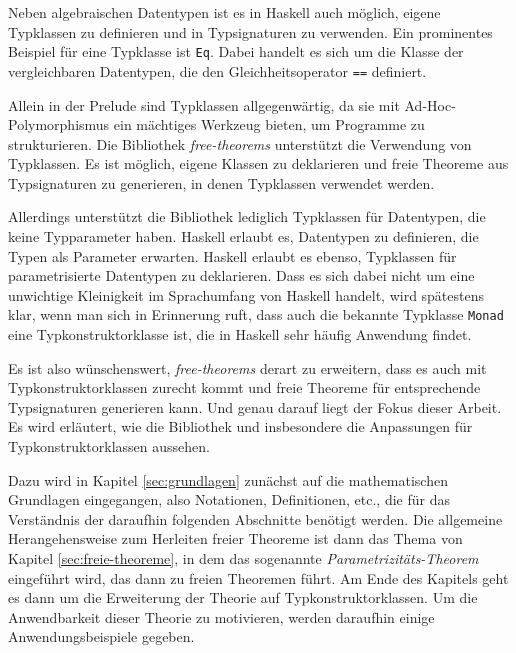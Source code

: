 Neben algebraischen Datentypen ist es in Haskell auch möglich, eigene Typklassen zu definieren und in
Typsignaturen zu verwenden. Ein prominentes Beispiel für eine Typklasse ist \texttt{Eq}. Dabei handelt es sich um
die Klasse der vergleichbaren Datentypen, die den Gleichheitsoperator \texttt{==} definiert.

Allein in der Prelude sind Typklassen allgegenwärtig, da sie mit Ad-Hoc-Poly\-mor\-phis\-mus ein mächtiges Werkzeug bieten,
um Programme zu strukturieren. Die Bibliothek \textit{free-theorems} unterstützt die Verwendung von Typklassen. Es ist möglich, eigene
Klassen zu deklarieren und freie Theoreme aus Typsignaturen zu generieren, in denen Typklassen verwendet werden.

Allerdings unterstützt die Bibliothek lediglich Typklassen für Datentypen, die keine Typparameter haben. Haskell erlaubt es,
Datentypen zu definieren, die Typen als Parameter erwarten. Haskell erlaubt es ebenso, Typklassen für parametrisierte
Datentypen zu deklarieren. Dass es sich dabei nicht um eine unwichtige Kleinigkeit im Sprachumfang von Haskell handelt, wird spätestens klar, wenn man
sich in Erinnerung ruft, dass auch die bekannte Typklasse \texttt{Monad} eine Typkonstruktorklasse ist, die in Haskell sehr häufig
Anwendung findet.

Es ist also wünschenswert, \textit{free-theorems} derart zu erweitern, dass es auch mit Typkonstruktorklassen zurecht kommt und
freie Theoreme für entsprechende Typsignaturen generieren kann. Und genau darauf liegt der Fokus dieser Arbeit. Es wird
erläutert, wie die Bibliothek und insbesondere die Anpassungen für Typkonstruktorklassen aussehen.

Dazu wird in Kapitel \ref{sec:grundlagen} zunächst auf die mathematischen Grundlagen eingegangen, also Notationen, Definitionen,
etc., die für das Verständnis der daraufhin folgenden Abschnitte benötigt werden.
Die allgemeine Herangehensweise zum Herleiten freier Theoreme ist dann das Thema von Kapitel \ref{sec:freie-theoreme}, in dem
das sogenannte \textit{Parametrizitäts-Theorem} eingeführt wird, das dann zu freien Theoremen führt.
Am Ende des Kapitels geht es dann um die Erweiterung der Theorie auf Typkonstruktorklassen. Um die Anwendbarkeit dieser
Theorie zu motivieren, werden daraufhin einige Anwendungsbeispiele gegeben.


